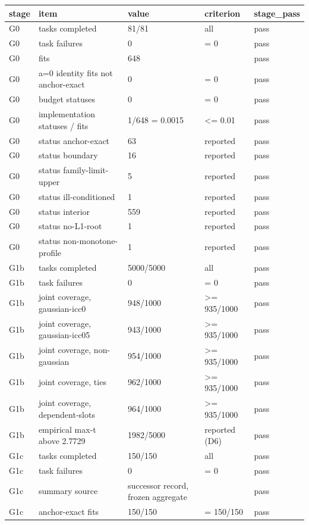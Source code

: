 \begin{tabular}{lllll}
\toprule
stage & item & value & criterion & stage\_pass \\
\midrule
G0 & tasks completed & 81/81 & all & pass \\
G0 & task failures & 0 & = 0 & pass \\
G0 & fits & 648 &  & pass \\
G0 & a=0 identity fits not anchor-exact & 0 & = 0 & pass \\
G0 & budget statuses & 0 & = 0 & pass \\
G0 & implementation statuses / fits & 1/648 = 0.0015 & \textless{}= 0.01 & pass \\
G0 & status anchor-exact & 63 & reported & pass \\
G0 & status boundary & 16 & reported & pass \\
G0 & status family-limit-upper & 5 & reported & pass \\
G0 & status ill-conditioned & 1 & reported & pass \\
G0 & status interior & 559 & reported & pass \\
G0 & status no-L1-root & 1 & reported & pass \\
G0 & status non-monotone-profile & 1 & reported & pass \\
G1b & tasks completed & 5000/5000 & all & pass \\
G1b & task failures & 0 & = 0 & pass \\
G1b & joint coverage, gaussian-icc0 & 948/1000 & \textgreater{}= 935/1000 & pass \\
G1b & joint coverage, gaussian-icc05 & 943/1000 & \textgreater{}= 935/1000 & pass \\
G1b & joint coverage, non-gaussian & 954/1000 & \textgreater{}= 935/1000 & pass \\
G1b & joint coverage, ties & 962/1000 & \textgreater{}= 935/1000 & pass \\
G1b & joint coverage, dependent-slots & 964/1000 & \textgreater{}= 935/1000 & pass \\
G1b & empirical max-t above 2.7729 & 1982/5000 & reported (D6) & pass \\
G1c & tasks completed & 150/150 & all & pass \\
G1c & task failures & 0 & = 0 & pass \\
G1c & summary source & successor record, frozen aggregate &  & pass \\
G1c & anchor-exact fits & 150/150 & = 150/150 & pass \\

\end{tabular}
